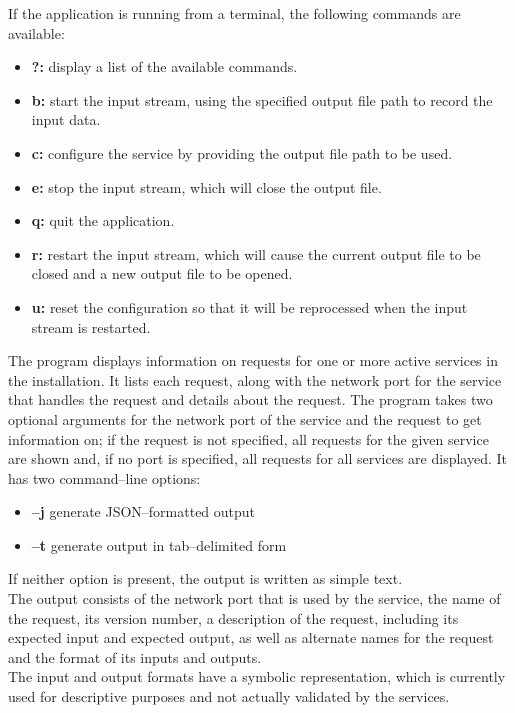If the application is running from a terminal, the following commands are available:
\begin{itemize}
\item \textbf{?:} display a list of the available commands.
\item \textbf{b:} start the input stream, using the specified output file path to record
the input data. 
\item \textbf{c:} configure the service by providing the output file path to be used. 
\item \textbf{e:} stop the input stream, which will close the output file. 
\item \textbf{q:} quit the application. 
\item \textbf{r:} restart the input stream, which will cause the current output file to be
closed and a new output file to be opened.
\item \textbf{u:} reset the configuration so that it will be reprocessed when the input
stream is restarted. 
\end{itemize}
The program  displays information on requests for one or more
active services in the \mplusm{} installation.
It lists each request, along with the \yarp{} network port for the service that handles
the request and details about the request.
The program takes two optional arguments for the \yarp{} network port of the service and
the request to get information on; if the request is not specified, all requests for the
given service are shown and, if no port is specified, all requests for all services are
displayed.
It has two command--line options:
\begin{itemize}
\item \textbf{--j} generate JSON--formatted output
\item \textbf{--t} generate output in tab--delimited form
\end{itemize}
If neither option is present, the output is written as simple text.\\

The output consists of the \yarp{} network port that is used by the service, the name of
the request, its version number, a description of the request, including its expected
input and expected output, as well as alternate names for the request and the format of
its inputs and outputs.\\

The input and output formats have a symbolic representation, which is currently used for
descriptive purposes and not actually validated by the services.\\


